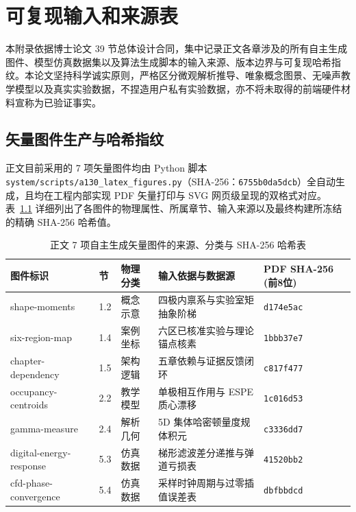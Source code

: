 \chapter{可复现输入和来源表}\label{app:reproducible-inputs}

本附录依据博士论文 39 节总体设计合同，集中记录正文各章涉及的所有自主生成图件、模型仿真数据集以及算法生成脚本的输入来源、版本边界与可复现哈希指纹。本论文坚持科学诚实原则，严格区分微观解析推导、唯象概念图景、无噪声教学模型以及真实实验数据，不捏造用户私有实验数据，亦不将未取得的前端硬件材料宣称为已验证事实。

\section{矢量图件生产与哈希指纹}\label{sec:appF-figures}

正文目前采用的 7 项矢量图件均由 Python 脚本 \texttt{system/scripts/a130\_latex\_figures.py}（SHA-256：\texttt{6755b0da5dcb}）全自动生成，且均在工程内部实现 PDF 矢量打印与 SVG 网页级呈现的双格式对应。表~\ref{tab:appF-figures} 详细列出了各图件的物理属性、所属章节、输入来源以及最终构建所冻结的精确 SHA-256 哈希值。

\begin{table}[htbp]
\centering
\small
\caption{正文 7 项自主生成矢量图件的来源、分类与 SHA-256 哈希表}\label{tab:appF-figures}
\begin{tabularx}{\textwidth}{llp{3.5cm}p{4.5cm}l}
\toprule
图件标识 & 节 & 物理分类 & 输入依据与数据源 & PDF SHA-256 (前8位) \\
\midrule
shape-moments & 1.2 & 概念示意 & 四极内禀系与实验室矩抽象阶梯 & \texttt{d174e5ac} \\
six-region-map & 1.4 & 案例坐标 & 六区已核准实验与理论锚点核素 & \texttt{1bbb37e7} \\
chapter-dependency & 1.5 & 架构逻辑 & 五章依赖与证据反馈闭环 & \texttt{c817f477} \\
occupancy-centroids & 2.2 & 教学模型 & 单极相互作用与 ESPE 质心漂移 & \texttt{1c016d53} \\
gamma-measure & 2.4 & 解析几何 & 5D 集体哈密顿量度规体积元 & \texttt{c3336dd7} \\
digital-energy-response & 5.3 & 仿真数据 & 梯形滤波差分递推与弹道亏损表 & \texttt{41520bb2} \\
cfd-phase-convergence & 5.4 & 仿真数据 & 采样时钟周期与过零插值误差表 & \texttt{dbfbbdcd} \\
\bottomrule
\end{tabularx}
\end{table}

